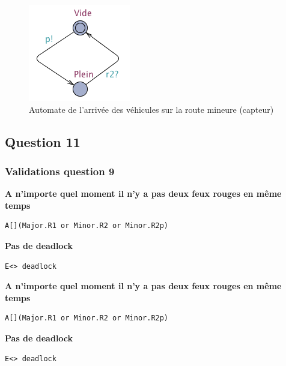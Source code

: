 \documentclass[11pt]{article}
\begin{document}
\begin{figure}[H]
	\centering
	\includegraphics{ressources/part3/Q10-3.png}
	\caption{Automate de l'arrivée des véhicules sur la route mineure (capteur)}
\end{figure}

\subsection{Question 11}\label{question-11}

\subsubsection{Validations question 9}

\textbf{A n'importe quel moment il n'y a pas deux feux rouges en même temps}
\begin{verbatim}
A[](Major.R1 or Minor.R2 or Minor.R2p)
\end{verbatim}

\textbf{Pas de deadlock}
\begin{verbatim}
E<> deadlock
\end{verbatim}


\textbf{A n'importe quel moment il n'y a pas deux feux rouges en même temps}
\begin{verbatim}
A[](Major.R1 or Minor.R2 or Minor.R2p)
\end{verbatim}

\textbf{Pas de deadlock}
\begin{verbatim}
E<> deadlock
\end{verbatim}
\end{document}
